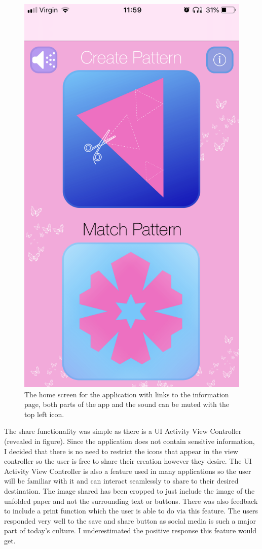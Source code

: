 \documentclass[11pt]{article}
\begin{document}
\begin{figure}[!ht]
\begin{minipage}{0.45\textwidth}
                            \includegraphics[width=0.7\linewidth]{KiriZen/main}
                            \caption{The home screen for the application with links to the information page, both parts of the app and the sound can be muted with the top left icon.}
                            \label{fig:kiriZen-main}
                        \end{minipage}
                    \end{figure}
                
                The share functionality was simple as there is a UI Activity View Controller (revealed in figure). Since the application does not contain sensitive information, I decided that there is no need to restrict the icons that appear in the view controller so the user is free to share their creation however they desire. The UI Activity View Controller is also a feature used in many applications so the user will be familiar with it and can interact seamlessly to share to their desired destination. The image shared has been cropped to just include the image of the unfolded paper and not the surrounding text or buttons. There was also feedback to include a print function which the user is able to do via this feature. The users responded very well to the save and share button as social media is such a major part of today's culture. I underestimated the positive response this feature would get.
            
\end{document}
